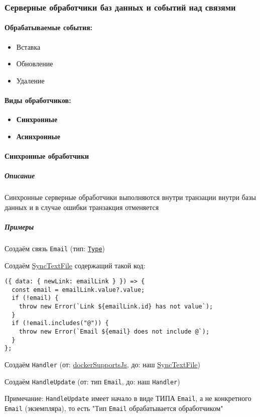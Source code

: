 \documentclass{article}
\begin{document}
\subsubsection{Серверные обработчики баз данных и событий над связями}
\paragraph{Обрабатываемые события:}
\begin{itemize}
  \item Вставка
  \item Обновление
  \item Удаление
\end{itemize}
\paragraph{Виды обработчиков:}
\begin{itemize}
  \item \textbf{Синхронные}
  \item \textbf{Асинхронные}
\end{itemize}

\paragraph{Синхронные обработчики}
\subparagraph{Описание}

Синхронные серверные обработчики выполняются внутри транзации внутри базы
данных и в случае ошибки
транзакция отменяется
\subparagraph{Примеры}

Создаём связь \texttt{Email} (тип: \texttt{\hyperlink{type.Def}{Type}})

Создаём \hyperlink{SyncTextFile.Def}{SyncTextFile} содержащий такой код:

\begin{lstlisting}
({ data: { newLink: emailLink } }) => {
  const email = emailLink.value?.value;
  if (!email) {
    throw new Error(`Link ${emailLink.id} has not value`);
  }
  if (!email.includes("@")) {
    throw new Error(`Email ${email} does not include @`);
  }
};
\end{lstlisting}

Создаём \texttt{Handler} (от:
\hyperlink{dockerSupportsJs.Def}{dockerSupportsJs}, до: наш
\hyperlink{SyncTextFile.Def}{SyncTextFile})

Создаём \texttt{HandleUpdate} (от: тип \texttt{Email}, до: наш
\texttt{Handler})

Примечание: \texttt{HandleUpdate} имеет начало в виде ТИПА \texttt{Email}, а
не конкретного \texttt{Email} (экземпляра), то есть "Тип \texttt{Email}
обрабатывается обработчиком"
\end{document}
